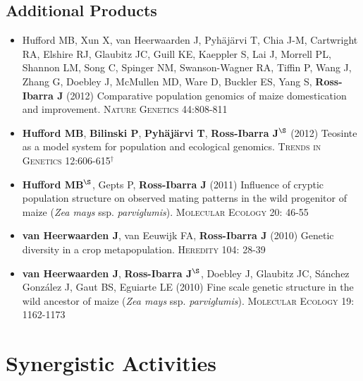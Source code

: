 \documentclass[11pt]{article}
\begin{document}
\subsection*{Additional Products}

\begin{itemize} \setlength{\itemsep}{0pt} \setlength{\parskip}{2pt} \setlength{\parsep}{0pt}


\item Hufford MB, Xun X, van Heerwaarden J, Pyh\"aj\"arvi T, Chia J-M, Cartwright RA, Elshire RJ, Glaubitz JC, Guill KE, Kaeppler S, Lai J, Morrell PL, Shannon LM, Song C, Spinger NM, Swanson-Wagner RA, Tiffin P, Wang J, Zhang G, Doebley J, McMullen MD, Ware D, Buckler ES, Yang S, {\bf Ross-Ibarra J} (2012) Comparative population genomics of maize domestication and improvement. \textsc{Nature Genetics} 44:808-811

\item {\bf Hufford MB}, {\bf Bilinski P}, {\bf Pyh\"aj\"arvi T}, {\bf Ross-Ibarra J}$^\S$ (2012) Teosinte as a model system for population and ecological genomics. \textsc{Trends in Genetics} 12:606-615$^\dagger$

\item {\bf Hufford MB}$^\S$, Gepts P, {\bf Ross-Ibarra J} (2011) Influence of cryptic population structure on observed mating patterns in the wild progenitor of maize (\emph{Zea mays} ssp. \emph{parviglumis}).  \textsc{Molecular Ecology} 20: 46-55

\item {\bf van Heerwaarden J}, van Eeuwijk FA, {\bf Ross-Ibarra J} (2010) Genetic diversity in a crop metapopulation.  \textsc{Heredity} 104: 28-39

\item {\bf van Heerwaarden J}, {\bf Ross-Ibarra J}$^\S$, Doebley J, Glaubitz JC, S\'{a}nchez Gonz\'{a}lez J, Gaut BS, Eguiarte LE (2010) Fine scale genetic structure in the wild ancestor of maize (\emph{Zea mays} ssp. \emph{parviglumis}).  \textsc{Molecular Ecology} 19: 1162-1173

\end{itemize}

\section{Synergistic Activities}
\end{document}

